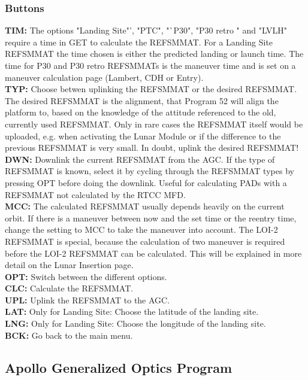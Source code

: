 \documentclass[11pt]{article} %
\begin{document}
\subsubsection{Buttons}
	\textbf{TIM:} The options "Landing Site"', "PTC", "`P30", "P30 retro " and "LVLH" require a time in GET to calculate the REFSMMAT. For a Landing Site REFSMMAT the time chosen is either the predicted landing or launch time. The time for P30 and P30 retro REFSMMATs is the maneuver time and is set on a maneuver calculation page (Lambert, CDH or Entry).\\
	\textbf{TYP:} Choose betwen uplinking the REFSMMAT or the desired REFSMMAT. The desired REFSMMAT is the alignment, that Program 52 will align the platform to, based on the knowledge of the attitude referenced to the old, currently used REFSMMAT. Only in rare cases the REFSMMAT itself would be uploaded, e.g. when activating the Lunar Module or if the difference to the previous REFSMMAT is very small. In doubt, uplink the desired REFSMMAT!\\
	\textbf{DWN:} Downlink the current REFSMMAT from the AGC. If the type of REFSMMAT is known, select it by cycling through the REFSMMAT types by pressing OPT before doing the downlink. Useful for calculating PADs with a REFSMMAT not calculated by the RTCC MFD.\\
	\textbf{MCC:} The calculated REFSMMAT usually depends heavily on the current orbit. If there is a maneuver between now and the set time or the reentry time, change the setting to MCC to take the maneuver into account. The LOI-2 REFSMMAT is special, because the calculation of two maneuver is required before the LOI-2 REFSMMAT can be calculated. This will be explained in more detail on the Lunar Insertion page.\\
	\textbf{OPT:} Switch between the different options.\\
	\textbf{CLC:} Calculate the REFSMMAT.\\
	\textbf{UPL:} Uplink the REFSMMAT to the AGC.\\
	\textbf{LAT:} Only for Landing Site: Choose the latitude of the landing site.\\
	\textbf{LNG:} Only for Landing Site: Choose the longitude of the landing site.\\
	\textbf{BCK:} Go back to the main menu.\\
	\subsection{Apollo Generalized Optics Program}
\end{document}
